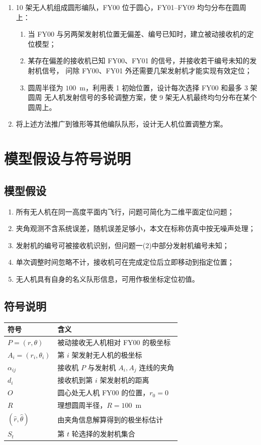 \documentclass[UTF8,a4paper,11pt]{ctexart}
\begin{document}
\begin{enumerate}
  \item 10 架无人机组成圆形编队，FY00 位于圆心，FY01--FY09 均匀分布在圆周上：
  \begin{enumerate}
    \item 当 FY00 与另两架发射机位置无偏差、编号已知时，建立被动接收机的定位模型；
    \item 某存在偏差的接收机已知 FY00、FY01 的信号，并接收若干编号未知的发射机信号，
    问除 FY00、FY01 外还需要几架发射机才能实现有效定位；
    \item 圆周半径为 $100$~m，利用表 1 初始位置，设计每次选择 FY00 和最多 3 架圆周
    无人机发射信号的多轮调整方案，使 9 架无人机最终均匀分布在某个圆周上。
  \end{enumerate}
  \item 将上述方法推广到锥形等其他编队队形，设计无人机位置调整方案。
\end{enumerate}

\section{模型假设与符号说明}

\subsection{模型假设}
\begin{enumerate}
  \item 所有无人机在同一高度平面内飞行，问题可简化为二维平面定位问题；
  \item 夹角观测不含系统误差，随机误差足够小，本文在标称仿真中按无噪声处理；
  \item 发射机的编号可被接收机识别，但问题一(2)中部分发射机编号未知；
  \item 单次调整时间忽略不计，接收机可在完成定位后立即移动到指定位置；
  \item 无人机具有自身的名义队形信息，可用作极坐标定位初值。
\end{enumerate}

\subsection{符号说明}
\begin{center}
\begin{tabular}{ll}
\toprule
符号 & 含义 \\
\midrule
$P=(r,\theta)$ & 被动接收无人机相对 FY00 的极坐标 \\
$A_i=(r_i,\theta_i)$ & 第 $i$ 架发射无人机的极坐标 \\
$\alpha_{ij}$ & 接收机 $P$ 与发射机 $A_i,A_j$ 连线的夹角 \\
$d_i$ & 接收机到第 $i$ 架发射机的距离 \\
$O$ & 圆心处无人机 FY00 的位置，$r_0=0$ \\
$R$ & 理想圆周半径，$R=100$~m \\
$(\hat r,\hat\theta)$ & 由夹角信息解算得到的极坐标估计 \\
$S_t$ & 第 $t$ 轮选择的发射机集合 \\
\bottomrule
\end{tabular}
\end{center}
\end{document}
